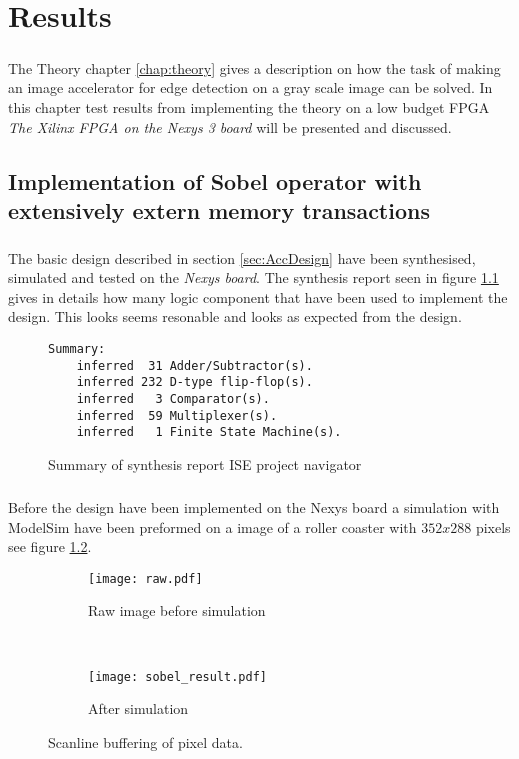 \chapter{Results}
\paragraph*{}
The Theory chapter \ref{chap:theory} gives a description on how the task of making an image accelerator for edge detection on a gray scale image can be solved. In this chapter test results from implementing the theory on a low budget FPGA \textit{The Xilinx FPGA on the Nexys 3 board} will be presented and discussed.  

\section{Implementation of Sobel operator with extensively extern memory transactions}
\paragraph*{}
The basic design described in section \ref{sec:AccDesign} have been synthesised, simulated and tested on the \textit{Nexys board}. The synthesis report seen in figure \ref{fig:sum_synthesis_report} gives in details how many logic component that have been used to implement the design. This looks seems resonable and looks as expected from the design.  

\begin{figure}[H]
\centering
\begin{BVerbatim}
Summary:
    inferred  31 Adder/Subtractor(s).
    inferred 232 D-type flip-flop(s).
    inferred   3 Comparator(s).
    inferred  59 Multiplexer(s).
    inferred   1 Finite State Machine(s).
\end{BVerbatim}
\caption{Summary of synthesis report ISE project navigator}
\label{fig:sum_synthesis_report}
\end{figure}

\paragraph*{}
Before the design have been implemented on the Nexys board a simulation with ModelSim have been preformed on a image of a roller coaster with $352x288$ pixels see figure \ref{fig:test_picture_raw}. 

\begin{figure}[H]
	\centering
	\begin{subfigure}[b]{0.4\textwidth}
		\texttt{[image: raw.pdf]}
		\caption{Raw image before simulation}
		\label{fig:test_picture_raw}
    \end{subfigure}%
        ~ %
    \begin{subfigure}[b]{0.4\textwidth}
    	\texttt{[image: sobel\_result.pdf]}
    	\caption{After simulation}
    	\label{fig:test_picture_sobel}
	\end{subfigure}
	\caption{Scanline buffering of pixel data.}
\end{figure}

